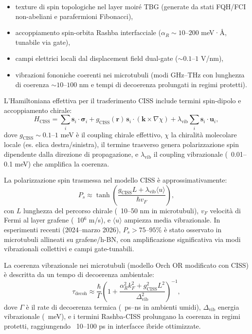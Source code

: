 \documentclass[11pt,a4paper]{article}
\theoremstyle{plain}
\theoremstyle{definition}
\begin{document}
\begin{itemize}
    \item texture di spin topologiche nel layer moiré TBG (generate da stati FQH/FCI non-abeliani e parafermioni Fibonacci),
    \item accoppiamento spin-orbita Rashba interfacciale ($\alpha_R \sim 10$--$200$ meV·Å, tunabile via gate),
    \item campi elettrici locali dal displacement field dual-gate ($\sim 0.1$--$1$ V/nm),
    \item vibrazioni fononiche coerenti nei microtubuli (modi GHz--THz con lunghezza di coerenza $\sim 10$--$100$ nm e tempi di decoerenza prolungati in regimi protetti).
\end{itemize}

L'Hamiltoniana effettiva per il trasferimento CISS include termini spin-dipolo e accoppiamento chirale:
\begin{equation}
H_{\text{CISS}} = \sum_i \mathbf{s}_i \cdot \boldsymbol{\sigma}_i + g_{\text{CISS}}(\mathbf{r}) \, \mathbf{s}_i \cdot (\mathbf{k} \times \nabla \chi) + \lambda_{\text{vib}} \sum_i \mathbf{s}_i \cdot \mathbf{u}_i,
\end{equation}
dove $g_{\text{CISS}} \sim 0.1$--$1$ meV è il coupling chirale effettivo, $\chi$ la chiralità molecolare locale (es. elica destra/sinistra), il termine trasverso genera polarizzazione spin dipendente dalla direzione di propagazione, e $\lambda_{\text{vib}}$ il coupling vibrazionale (~0.01--0.1 meV) che amplifica la coerenza.

La polarizzazione spin trasmessa nel modello CISS è approssimativamente:
\begin{equation}
P_s \approx \tanh\left( \frac{g_{\text{CISS}} L + \lambda_{\text{vib}} \langle u \rangle}{\hbar v_F} \right),
\end{equation}
con $L$ lunghezza del percorso chirale (~10--50 nm in microtubuli), $v_F$ velocità di Fermi al layer grafene (~10$^6$ m/s), e $\langle u \rangle$ ampiezza media vibrazionale. In esperimenti recenti (2024--marzo 2026), $P_s > 75$--$95$\% è stato osservato in microtubuli allineati su grafene/h-BN, con amplificazione significativa via modi vibrazionali collettivi e campi gate-tunabili.

La coerenza vibrazionale nei microtubuli (modello Orch OR modificato con CISS) è descritta da un tempo di decoerenza ambientale:
\begin{equation}
\tau_{\text{decoh}} \approx \frac{\hbar}{\Gamma} \left( 1 + \frac{\alpha_R^2 k_F^2 + g_{\text{CISS}}^2 L^2}{\Delta_{\text{vib}}^2} \right)^{-1},
\end{equation}
dove $\Gamma$ è il rate di decoerenza termica (~ps--ns in ambienti umidi), $\Delta_{\text{vib}}$ energia vibrazionale (~meV), e i termini Rashba-CISS prolungano la coerenza in regimi protetti, raggiungendo ~10--100 ps in interfacce ibride ottimizzate.
\end{document}
